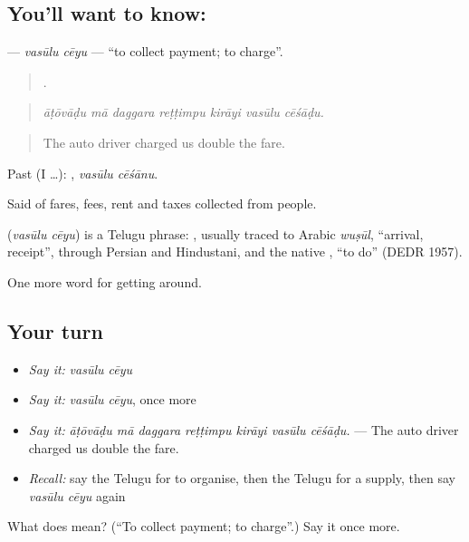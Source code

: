 \subsection*{You'll want to know:  }
\textbf{ } — \emph{vasūlu cēyu} — \textquotedblleft{}to collect payment; to charge\textquotedblright{}.

\begin{quote}
      .
\end{quote}

\begin{quote}
\emph{āṭōvāḍu mā daggara reṭṭimpu kirāyi vasūlu cēśāḍu.}
\end{quote}

\begin{quote}
The auto driver charged us double the fare.
\end{quote}

Past (I …):  , \emph{vasūlu cēśānu}.

Said of fares, fees, rent and taxes collected from people.

\begin{cousinweb}
\textbf{ } (\emph{vasūlu cēyu}) is a Telugu phrase: , usually traced to Arabic \emph{wuṣūl}, \textquotedblleft{}arrival, receipt\textquotedblright{}, through Persian and Hindustani, and the native , \textquotedblleft{}to do\textquotedblright{} (DEDR 1957).
\end{cousinweb}

\begin{grammarlens}[title={What you've built}]
One more word for getting around.
\end{grammarlens}

\subsection*{Your turn}
\begin{itemize}
\raggedright
  \item \emph{Say it:} \emph{vasūlu cēyu}
  \item \emph{Say it:} \emph{vasūlu cēyu}, once more
  \item \emph{Say it:} \emph{āṭōvāḍu mā daggara reṭṭimpu kirāyi vasūlu cēśāḍu.} — The auto driver charged us double the fare.
  \item \emph{Recall:} say the Telugu for to organise, then the Telugu for a supply, then say \emph{vasūlu cēyu} again
\end{itemize}

\begin{tcolorbox}[breakable,colback=teal!4,colframe=teal!35!black,title={Before you move on}]
What does   mean? (\textquotedblleft{}To collect payment; to charge\textquotedblright{}.) Say it once more.
\end{tcolorbox}

